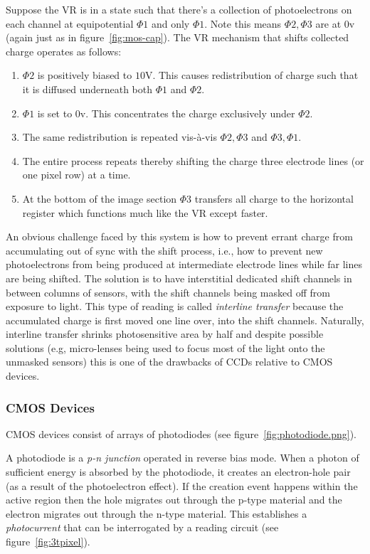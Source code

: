 Suppose the VR is in a state such that there's a collection of photoelectrons on each channel at equipotential \(\Phi1\) and only \(\Phi1\). Note this means \(\Phi2, \Phi3\) are at \(0\)v (again just as in figure~\ref{fig:mos-cap}). The VR mechanism that shifts collected charge operates as follows:
\begin{mdframed}
\begin{enumerate}
	\item \(\Phi2\) is positively biased to \(10\)V. This causes redistribution of charge such that it is diffused underneath both \(\Phi1\) and \(\Phi2\).
	\item \(\Phi1\) is set to \(0\)v. This concentrates the charge exclusively under \(\Phi2\).
	\item The same redistribution is repeated vis-à-vis \(\Phi2, \Phi3\) and \(\Phi3, \Phi1\).
	\item The entire process repeats thereby shifting the charge three electrode lines (or one pixel row) at a time.
	\item At the bottom of the image section \(\Phi3\) transfers all charge to the horizontal register which functions much like the VR except faster.
\end{enumerate}
\end{mdframed}
%
An obvious challenge faced by this system is how to prevent errant charge from accumulating out of sync with the shift process, i.e., how to prevent new photoelectrons from being produced at intermediate electrode lines while far lines are being shifted.
%
The solution is to have interstitial dedicated shift channels in between columns of sensors, with the shift channels being masked off from exposure to light.
%
This type of reading is called \textit{interline transfer} because the accumulated charge is first moved one line over, into the shift channels.
%
Naturally, interline transfer shrinks photosensitive area by half and despite possible solutions (e.g, micro-lenses being used to focus most of the light onto the unmasked sensors) this is one of the drawbacks of CCDs relative to CMOS devices.

\subsubsection{CMOS Devices}

CMOS devices consist of arrays of photodiodes (see figure~\ref{fig:photodiode.png}).

A photodiode is a \textit{p-n junction} operated in reverse bias mode.
%
When a photon of sufficient energy is absorbed by the photodiode, it creates an electron-hole pair (as a result of the photoelectron effect).
%
If the creation event happens within the active region then the hole migrates out through the p-type material and the electron migrates out through the n-type material.
%
This establishes a \textit{photocurrent} that can be interrogated by a reading circuit (see figure~\ref{fig:3tpixel}).


